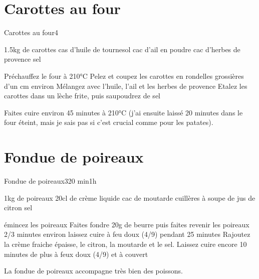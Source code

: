 {\section{Carottes au four}
\begin{recette}{Carottes au four}{4}{}{}
\begin{ingredients}
\ingredient 1.5kg de carottes
 cas d'huile de tournesol
 cac d'ail en poudre
 cac d'herbes de provence
\ingredient sel 
\end{ingredients}

\begin{preparation}
\etape Préchauffez le four à 210°C
\etape Pelez et coupez les carottes en rondelles grossières d'un cm environ
\etape Mélangez avec l'huile, l'ail et les herbes de provence
\etape Etalez les carottes dans un lèche frite, puis saupoudrez de sel
\end{preparation}

\begin{cuisson}
Faites cuire environ 45 minutes à 210°C (j'ai ensuite laissé 20 minutes dans le four éteint, mais je sais pas si c'est crucial comme pour les patates).
\end{cuisson}
\end{recette}

\section{Fondue de poireaux}
\begin{recette}{Fondue de poireaux}{3}{20 min}{1h}
\begin{ingredients}[3 personnes]
\ingredient 1kg de poireaux
\ingredient 20cl de crème liquide
 cac de moutarde
 cuillères à soupe de jus de citron
\ingredient sel
\end{ingredients}

\begin{preparation}
\etape émincez les poireaux
\etape Faites fondre 20g de beurre puis faites revenir les poireaux 2/3 minutes environ
\etape laissez cuire à feu doux (4/9) pendant 25 minutes
\etape Rajoutez la crème fraiche épaisse, le citron, la moutarde et le sel.
\etape Laissez cuire encore 10 minutes de plus à feux doux (4/9) et à couvert
\begin{remarque}
La fondue de poireaux accompagne très bien des poissons.
\end{remarque}
\end{preparation}
\end{recette}

}
